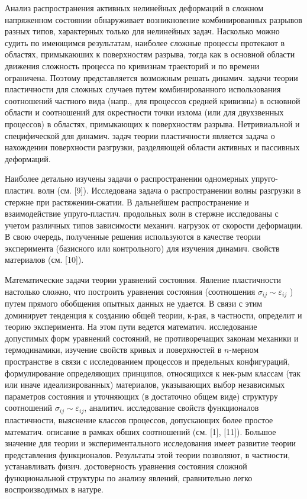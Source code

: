 \documentclass[10pt]{article}
\begin{document}
Анализ распространения активных нелинейных деформаций в сложном напряженном состоянии обнаруживает возникновение комбинированных разрывов разных типов, характерных только для нелинейных задач. Насколько можно судить по имеющимся результатам, наиболее сложные процессы протекают в областях, примыкаюших к поверхностям разрыва, тогда как в основной области движения сложность процесса по кривизнам траекторий и по времени ограничена. Поэтому представляется возможным решать динамич. задачи теории пластичности для сложных случаев путем комбинированного использования соотношений частного вида (напр., для процессов средней кривизны) в основной области и соотношений для окрестности точки излома (или для двухзвенных процессов) в областях, примыкающих к поверхностям разрыва. Нетривиальной и специфической для динамич. задач теории пластичности является задача о нахождении поверхности разгрузки, разделяющей области активных и пассивных деформаций.



Наиболее детально изучены задачи о распространении одномерных упруго-пластич. волн (см. [9]). Исследована задача о распространении волны разгрузки в стержне при растяжении-сжатии. В дальнейшем распространение и взаимодействие упруго-пластич. продольных волн в стержне исследованы с учетом различных типов зависимости механич. нагрузок от скорости деформации. В свою очередь, полученные решения используются в качестве теории эксперимента (базисного или контрольного) для изучения динамич. свойств материалов (см. [10]).



Математические задачи теории уравнений состояния. Явление пластичности настолько сложно, что построить уравнения состояния (соотношения $\sigma_{i j} \sim \varepsilon_{i j}$ ) путем прямого обобщения опытных данных не удается. В связи с этим доминирует тенденция к созданию общей теории, к-рая, в частности, определит и теорию эксперимента. На этом пути ведется математич. исследование допустимых форм уравнений состояний, не противоречащих законам механики и термодинамики, изучение свойств кривых и поверхностей в $n$-мерном пространстве в связи с исследованием процессов и предельных конфигураций, формулирование определяющих принципов, относящихся к нек-рым классам (так или иначе идеализированных) материалов, указывающих выбор независимых параметров состояния и уточняющих (в достаточно общем виде) структуру соотношений $\sigma_{i j} \sim \varepsilon_{i j}$, аналитич. исследование свойств функционалов пластичности, выяснение классов процессов, допускающих более простое математич. описание в рамках обших соотношений (см. [1], [11]). Большое значение для теории и экспериментального исследования имеет развитие теории представления функционалов. Результаты этой теории позволяют, в частности, устанавливать физич. достоверность уравнения состояния сложной функциональной структуры по анализу явлений, сравнительно легко воспроизводимых в натуре.
\end{document}
